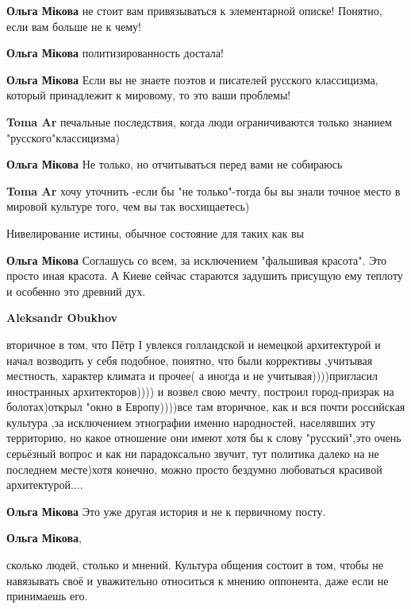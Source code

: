\begin{itemize}
\begin{itemize}
\begin{itemize}
\textbf{Ольга Мікова} не стоит вам привязываться к элементарной описке! Понятно, если вам больше не к чему!

\textbf{Ольга Мікова} политизированность достала!

\textbf{Ольга Мікова} Если вы не знаете поэтов и писателей русского классицизма, который принадлежит к мировому, то это ваши проблемы!

\textbf{Toma Ar} печальные последствия, когда люди ограничиваются только знанием "русского"классицизма)

\textbf{Ольга Мікова} Не только, но отчитываться перед вами не собираюсь

\textbf{Toma Ar} хочу уточнить -если бы "не только"-тогда бы вы знали точное место в мировой культуре того, чем вы так восхищаетесь)

Нивелирование истины, обычное состояние для таких как вы
\end{itemize} %

\textbf{Ольга Мікова}
Соглашусь со всем, за исключением "фальшивая красота".
Это просто иная красота.
А Киеве сейчас стараются задушить присущую ему теплоту и особенно это древний дух.

\begin{itemize} %
\textbf{Aleksandr Obukhov} 

вторичное в том, что Пётр І увлекся голландской и немецкой архитектурой и начал
возводить у себя подобное, понятно, что были коррективы ,учитывая местность,
характер климата и прочее( а иногда и не учитывая))))пригласил иностранных
архитекторов)))) и возвел свою мечту, построил город-призрак на болотах)открыл
"окно в Европу))))все там вторичное, как и вся почти российская культура ,за
исключением этнографии именно народностей, населявших эту территорию, но какое
отношение они имеют хотя бы к слову "русский",это очень серьёзный вопрос и как
ни парадоксально звучит, тут политика далеко на не последнем месте)хотя конечно,
можно просто бездумно любоваться красивой архитектурой....

\textbf{Ольга Мікова}
Это уже другая история и не к первичному посту.
\end{itemize} %

\textbf{Ольга Мікова}, 

сколько людей, столько и мнений. Культура общения состоит в том, чтобы не
навязывать своё и уважительно относиться к мнению оппонента, даже если не
принимаешь его.


\end{itemize}
\end{itemize}
